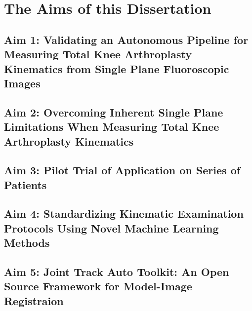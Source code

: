 \chapter{The Aims of this Dissertation}
\label{sec:aims}

\section{Aim 1: Validating an Autonomous Pipeline for Measuring Total Knee Arthroplasty Kinematics from Single Plane Fluoroscopic Images}
\label{sec:aim1}


\section{Aim 2: Overcoming Inherent Single Plane Limitations When Measuring Total Knee Arthroplasty Kinematics}
\label{sec:aim2}


\section{Aim 3: Pilot Trial of Application on Series of Patients}
\label{sec:aim3}


\section{Aim 4: Standardizing Kinematic Examination Protocols Using Novel Machine Learning Methods}
\label{sec:aim4}


\section{Aim 5: Joint Track Auto Toolkit: An Open Source Framework for Model-Image Registraion}
\label{sec:aim5}



